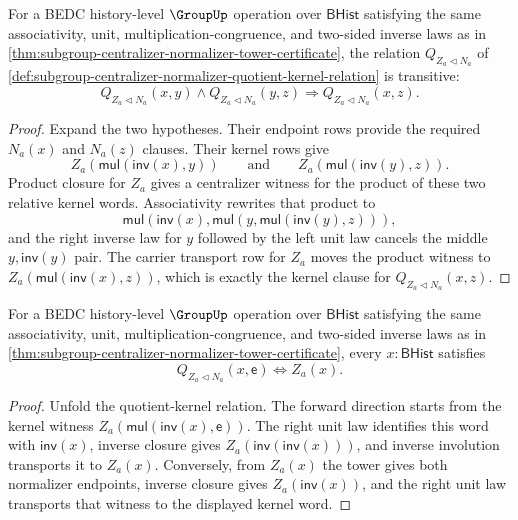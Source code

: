 \begin{theorem}
\label{thm:subgroup-centralizer-quotient-kernel-transitivity}
For a BEDC history-level $\GroupUp$ operation over $\mathsf{BHist}$ satisfying
the same associativity, unit, multiplication-congruence, and two-sided inverse
laws as in
\autoref{thm:subgroup-centralizer-normalizer-tower-certificate}, the relation
$Q_{Z_a\triangleleft N_a}$ of
\autoref{def:subgroup-centralizer-normalizer-quotient-kernel-relation} is
transitive:
$$
Q_{Z_a\triangleleft N_a}(x,y)\land Q_{Z_a\triangleleft N_a}(y,z)
\Longrightarrow Q_{Z_a\triangleleft N_a}(x,z).
$$
\end{theorem}
\begin{proof}
Expand the two hypotheses. Their endpoint rows provide the required
$N_a(x)$ and $N_a(z)$ clauses. Their kernel rows give
$$
Z_a(\mathsf{mul}(\mathsf{inv}(x),y))
\qquad\text{and}\qquad
Z_a(\mathsf{mul}(\mathsf{inv}(y),z)).
$$
Product closure for $Z_a$ gives a centralizer witness for the product of these
two relative kernel words. Associativity rewrites that product to
$$
\mathsf{mul}(\mathsf{inv}(x),
  \mathsf{mul}(y,\mathsf{mul}(\mathsf{inv}(y),z))),
$$
and the right inverse law for $y$ followed by the left unit law cancels the
middle $y,\mathsf{inv}(y)$ pair. The carrier transport row for $Z_a$ moves the
product witness to
$Z_a(\mathsf{mul}(\mathsf{inv}(x),z))$, which is exactly the kernel clause for
$Q_{Z_a\triangleleft N_a}(x,z)$.
\end{proof}

\begin{theorem}
\label{thm:subgroup-centralizer-quotient-kernel-empty-right-fiber}
For a BEDC history-level $\GroupUp$ operation over $\mathsf{BHist}$ satisfying
the same associativity, unit, multiplication-congruence, and two-sided inverse
laws as in
\autoref{thm:subgroup-centralizer-normalizer-tower-certificate}, every
$x:\mathsf{BHist}$ satisfies
$$
Q_{Z_a\triangleleft N_a}(x,\mathsf{e})\Longleftrightarrow Z_a(x).
$$
\end{theorem}
\begin{proof}
Unfold the quotient-kernel relation. The forward direction starts from the
kernel witness
$Z_a(\mathsf{mul}(\mathsf{inv}(x),\mathsf{e}))$. The right unit law identifies
this word with $\mathsf{inv}(x)$, inverse closure gives
$Z_a(\mathsf{inv}(\mathsf{inv}(x)))$, and inverse involution transports it to
$Z_a(x)$. Conversely, from $Z_a(x)$ the tower gives both normalizer endpoints,
inverse closure gives $Z_a(\mathsf{inv}(x))$, and the right unit law transports
that witness to the displayed kernel word.
\end{proof}

